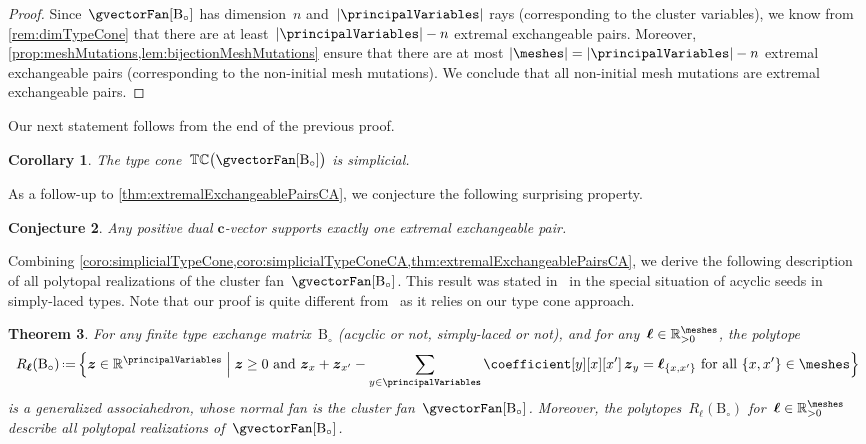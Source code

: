\documentclass{amsart}
\newtheorem{theorem}{Theorem}[section]
\newtheorem{corollary}[theorem]{Corollary}
\newtheorem{conjecture}[theorem]{Conjecture}
\theoremstyle{definition}
\newcommand{\R}{\mathbb{R}} %
\renewcommand{\b}[1]{{\boldsymbol{#1}}} %
\newcommand{\Bigset}[2]{\Big\{ #1 \;\Big|\; #2 \Big\}} %
\newcommand{\eqdef}{\mbox{\,\raisebox{0.2ex}{\scriptsize\ensuremath{\mathrm:}}\ensuremath{=}\,}} %
\newcommand{\typeCone}{\mathbb{TC}} %
\newcommand{\B}{\mathrm{B}} %
\begin{document}
\begin{proof}
Since~$\gvectorFan[\B_\circ]$ has dimension~$n$ and~$|\principalVariables|$ rays (corresponding to the cluster variables), we know from \cref{rem:dimTypeCone} that there are at least~$|\principalVariables| - n$ extremal exchangeable pairs.
Moreover, \cref{prop:meshMutations,lem:bijectionMeshMutations} ensure that there are at most $|\meshes| = |\principalVariables| - n$ extremal exchangeable pairs (corresponding to the non-initial mesh mutations).
We conclude that all non-initial mesh mutations are extremal exchangeable pairs.
\end{proof}

Our next statement follows from the end of the previous proof.

\begin{corollary}
\label{coro:simplicialTypeConeCA}
The type cone~$\typeCone \big( \gvectorFan[\B_\circ] \big)$ is simplicial.
\end{corollary}

As a follow-up to \cref{thm:extremalExchangeablePairsCA}, we conjecture the following surprising property.

\begin{conjecture}
Any positive dual $\b{c}$-vector supports exactly one extremal exchangeable pair.
\end{conjecture}

Combining \cref{coro:simplicialTypeCone,coro:simplicialTypeConeCA,thm:extremalExchangeablePairsCA}, we derive the following description of all polytopal realizations of the cluster fan~$\gvectorFan[\B_\circ]$.
This result was stated in~\cite{BazierMatteChapelierLaguetDouvilleMousavandThomasYildirim} in the special situation of acyclic seeds in simply-laced types.
Note that our proof is quite different from~\cite{BazierMatteChapelierLaguetDouvilleMousavandThomasYildirim} as it relies on our type cone approach.

\begin{theorem}
\label{thm:allPolytopalRealizationsCA}
For any finite type exchange matrix~$\B_\circ$ (acyclic or not, simply-laced or not), and for any~$\b{\ell} \in \R_{>0}^{\meshes}$, the polytope
\[
R_{\b{\ell}}(\B_\circ) \eqdef \Bigset{\b{z} \in \R^{\principalVariables}}{\b{z} \ge 0 \text{ and } \b{z}_x + \b{z}_{x'} - \sum_{y \in \principalVariables} \coefficient[y][x][x'] \, \b{z}_{y} = \b{\ell}_{\{x,x'\}} \text{ for all } \{x,x'\} \in \meshes}
\]
is a generalized associahedron, whose normal fan is the cluster fan~$\gvectorFan[\B_\circ]$.
Moreover, the polytopes~$R_\b{\ell}(\B_\circ)$ for~$\b{\ell} \in \R_{>0}^{\meshes}$ describe all polytopal realizations of~$\gvectorFan[\B_\circ]$.
\end{theorem}
\end{document}
